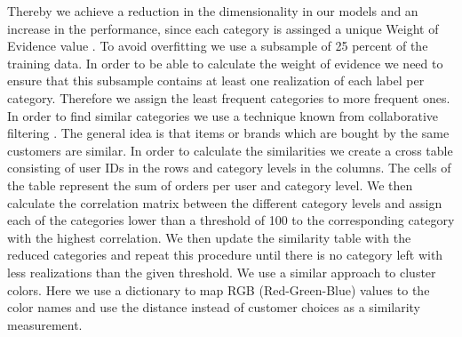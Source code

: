\documentclass[12pt]{article}
\begin{document}
Thereby we achieve a reduction in the dimensionality in our models and an increase in the performance, since each category is assinged a unique Weight of Evidence value \cite{wod1985weight}. To avoid overfitting we use a subsample of 25 percent of the training data. In order to be able to calculate the weight of evidence we need to ensure that this subsample contains at least one realization of each label per category. Therefore we assign the least frequent categories to more frequent ones. In order to find similar categories we use a technique known from collaborative filtering \cite{vucetic2000regression}. The general idea is that items or brands which are bought by the same customers are similar. In order to calculate the similarities we create a cross table consisting of user IDs in the rows and category levels in the columns. The cells of the table represent the sum of orders per user and category level. We then calculate the correlation matrix between the different category levels and assign each of the categories lower than a threshold of 100 to the corresponding category with the highest correlation. We then update the similarity table with the reduced categories and repeat this procedure until there is no category left with less realizations than the given threshold. We use a similar approach to cluster colors. Here we use a dictionary \cite{WinNT6} to map RGB (Red-Green-Blue) values to the color names and use the distance instead of customer choices as a similarity measurement.
\end{document}
